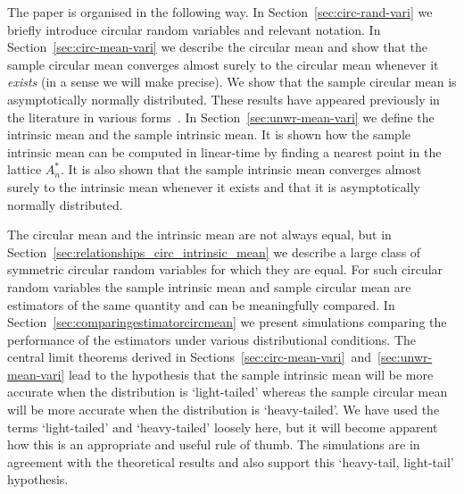 \documentclass[journal]{IEEEtran}
\begin{document}

The paper is organised in the following way.  In Section~\ref{sec:circ-rand-vari} we briefly introduce circular random variables and relevant notation. In Section~\ref{sec:circ-mean-vari} we describe the circular mean and show that the sample circular mean converges almost surely to the circular mean whenever it \emph{exists} (in a sense we will make precise). We show that the sample circular mean is asymptotically normally distributed. These results have appeared previously in the literature in various forms~\cite{Quinn2009_dasp_phase_only_information_loss,Fisher_common_mean_direction_dir_est_no_dist_assumptions1983,Jammalamadaka_dir_stat_book,mardia_stat_dir_data_book_1975,Bhattacharya_int_ext_means_2003}.  In Section~\ref{sec:unwr-mean-vari} we define the intrinsic mean and the sample intrinsic mean. It is shown how the sample intrinsic mean can be computed in linear-time by finding a nearest point in the lattice $A_n^*$. It is also shown that the sample intrinsic mean converges almost surely to the intrinsic mean whenever it exists and that it is asymptotically normally distributed. %

The circular mean and the intrinsic mean are not always equal, but in Section~\ref{sec:relationships_circ_intrinsic_mean} we describe a large class of symmetric circular random variables for which they are equal.  For such circular random variables the sample intrinsic mean and sample circular mean are estimators of the same quantity and can be meaningfully compared.  In Section~\ref{sec:comparingestimatorcircmean} we present simulations comparing the performance of the estimators under various distributional conditions.  The central limit theorems derived in Sections~\ref{sec:circ-mean-vari}~and~\ref{sec:unwr-mean-vari} lead to the hypothesis that the sample intrinsic mean will be more accurate when the distribution is `light-tailed' whereas the sample circular mean will be more accurate when the distribution is `heavy-tailed'. We have used the terms `light-tailed' and `heavy-tailed' loosely here, but it will become apparent how this is an appropriate and useful rule of thumb. The simulations are in agreement with the theoretical results and also support this `heavy-tail, light-tail' hypothesis.
 
\end{document}
